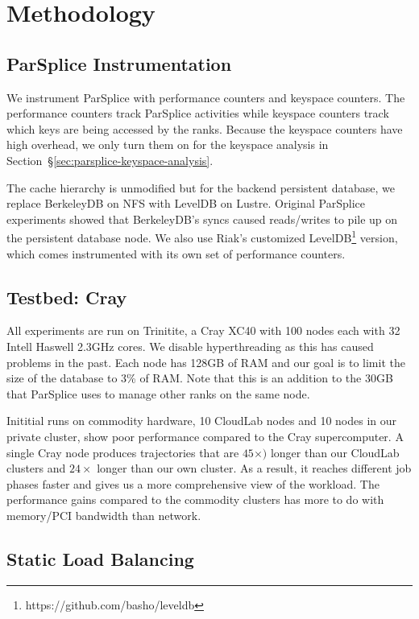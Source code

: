 \section{Methodology}

\subsection{ParSplice Instrumentation}
\label{sec:parsplice-instrumentation}

We instrument ParSplice with performance counters and keyspace counters.  The
performance counters track ParSplice activities while keyspace counters track
which keys are being accessed by the ranks. Because the keyspace counters have
high overhead, we only turn them on for the keyspace analysis in
Section~\S\ref{sec:parsplice-keyspace-analysis}.

The cache hierarchy is unmodified but for the backend persistent database, we
replace BerkeleyDB on NFS with LevelDB on Lustre. Original ParSplice
experiments showed that BerkeleyDB's syncs caused reads/writes to pile up on
the persistent database node. We also use Riak's customized
LevelDB\footnote{https://github.com/basho/leveldb} version, which comes
instrumented with its own set of performance counters.

\subsection{Testbed: Cray}

All experiments are run on Trinitite, a Cray XC40 with 100 nodes each with 32
Intell Haswell 2.3GHz cores. We disable hyperthreading as this has caused
problems in the past. Each node has 128GB of RAM and our goal is to limit the
size of the database to 3\% of RAM. Note that this is an addition to the 30GB
that ParSplice uses to manage other ranks on the same node. 

Inititial runs on commodity hardware, 10 CloudLab nodes and 10 nodes in our
private cluster, show poor performance compared to the Cray supercomputer. A
single Cray node produces trajectories that are \(45\times)\) longer than our
CloudLab clusters and \(24\times\) longer than our own cluster. As a result, it
reaches different job phases faster and gives us a more comprehensive view of
the workload. The performance gains compared to the commodity clusters has more
to do with memory/PCI bandwidth than network.

\subsection{Static Load Balancing}
\label{sec:static-load-balancing}

